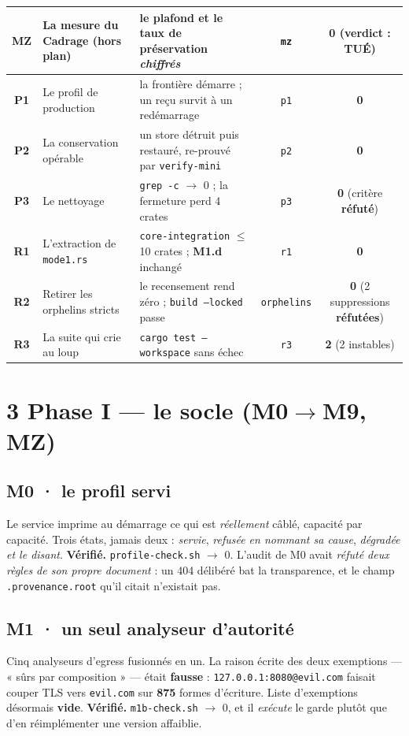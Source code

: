 \documentclass[11pt]{article}
\newcommand{\code}[1]{\texttt{\small #1}}
\newcommand{\best}[1]{{\color{efesolve}\textbf{#1}}}
\newcommand{\pire}[1]{{\color{efered}\textbf{#1}}}
\newcommand{\moyen}[1]{{\color{efeamber}\textbf{#1}}}
\newcommand{\mm}[1]{\textbf{#1}}
\newcommand{\sz}[1]{{\small #1}}
\newcommand{\mesure}[1]{{\color{efeteal}\textbf{Vérifié.} }#1\par}
\begin{document}
{\begin{longtable}{@{}c >{\raggedright\arraybackslash}p{4.3cm} >{\raggedright\arraybackslash}p{5.5cm} c c@{}}
\mm{MZ} & La mesure du Cadrage \sz{(hors plan)} & le plafond et le taux de préservation \emph{chiffrés} & \code{mz} & \best{0} \sz{(verdict : \pire{TUÉ})} \\
\midrule
\mm{P1} & Le profil de production & la frontière démarre ; un reçu survit à un redémarrage & \code{p1} & \best{0} \\
\mm{P2} & La conservation opérable & un store détruit puis restauré, re-prouvé par \code{verify-mini} & \code{p2} & \best{0} \\
\mm{P3} & Le nettoyage & \code{grep -c} $\rightarrow$ 0 ; la fermeture perd 4 crates & \code{p3} & \best{0} \sz{(critère \pire{réfuté})} \\
\midrule
\mm{R1} & L'extraction de \code{mode1.rs} & \code{core-integration} $\leq$ 10 crates ; \mm{M1.d} inchangé & \code{r1} & \best{0} \\
\mm{R2} & Retirer les orphelins stricts & le recensement rend zéro ; \code{build --locked} passe & \code{orphelins} & \best{0} \sz{(2 suppressions \pire{réfutées})} \\
\mm{R3} & La suite qui crie au loup & \code{cargo test --workspace} sans échec & \code{r3} & \moyen{2} \sz{(2 instables)} \\
\bottomrule
\end{longtable}}

\section{3 \;\textbar\; Phase I --- le socle (\mm{M0}$\rightarrow$\mm{M9}, \mm{MZ})}

\subsection{\mm{M0} · le profil servi}
Le service imprime au démarrage ce qui est \emph{réellement} câblé, capacité par capacité. Trois
états, jamais deux : \emph{servie}, \emph{refusée en nommant sa cause}, \emph{dégradée et le disant}.
\mesure{\code{profile-check.sh} $\rightarrow$ 0. L'audit de M0 avait \emph{réfuté deux règles de son
propre document} : un 404 délibéré bat la transparence, et le champ \code{.provenance.root} qu'il
citait n'existait pas.}

\subsection{\mm{M1} · un seul analyseur d'autorité}
Cinq analyseurs d'egress fusionnés en un. La raison écrite des deux exemptions --- « sûrs par
composition » --- était \pire{fausse} : \code{127.0.0.1:8080@evil.com} faisait couper TLS vers
\code{evil.com} sur \textbf{875} formes d'écriture. Liste d'exemptions désormais \textbf{vide}.
\mesure{\code{m1b-check.sh} $\rightarrow$ 0, et il \emph{exécute} le garde plutôt que d'en
réimplémenter une version affaiblie.}
\end{document}
